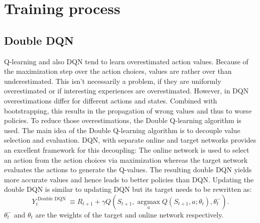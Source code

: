 \documentclass[12pt]{article}
\begin{document}
\section{Training process}
\subsection{Double DQN}
Q-learning  and also DQN tend to learn overestimated action values. Because of the maximization step over the action choices, values are rather over than underestimated.
This isn't necessarily a problem, if they are uniformly overestimated or if interesting experiences are overestimated. However, in DQN overestimations differ for different actions and states. Combined with bootstrapping, this results in the propagation of wrong values and thus to worse policies. To reduce those overestimations, the Double Q-learning algorithm is used. 
The main idea of the Double Q-learning algorithm is to decouple value selection and evaluation.
DQN, with separate online and target networks provides an excellent framework for this decoupling:
The online network is used to select an action from the action choices via maximization whereas the target network evaluates the actions to generate the Q-values.
The resulting double DQN yields more accurate values and hence leads to better policies than DQN.
Updating the double DQN is similar to updating DQN but its target needs to be rewritten as:
\begin{equation}
Y_{t}^{\text { Double DQN }} \equiv R_{t+1}+\gamma Q\left(S_{t+1}, \underset{a}{\operatorname{argmax}} Q\left(S_{t+1}, a ; \theta_{t}\right), \theta_{t}^{-}\right).
\end{equation}
$\theta_{t}^{-}$ and $\theta_{t}$ are the weights of the target and online network respectively.
\cite{DBLP:journals/corr/HasseltGS15}
\end{document}
